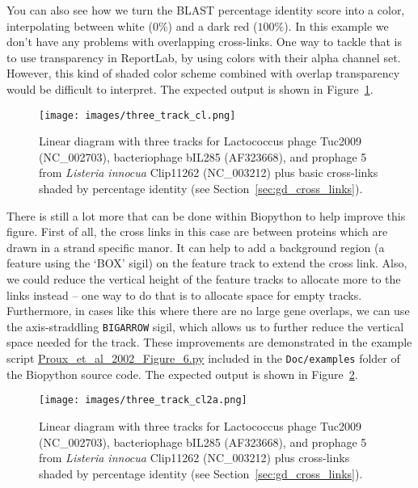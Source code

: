 You can also see how we turn the BLAST percentage identity score into a color,
interpolating between white ($0\%$) and a dark red ($100\%$). In this example
we don't have any problems with overlapping cross-links. One way to tackle that
is to use transparency in ReportLab, by using colors with their alpha channel set.
However, this kind of shaded color scheme combined with overlap transparency
would be difficult to interpret.
\noindent The expected output is shown in Figure~\ref{fig:three_track_cl}.
\begin{figure}[htbp]
\centering
\texttt{[image: images/three\_track\_cl.png]}
\caption{Linear diagram with three tracks for Lactococcus phage Tuc2009
(NC\_002703), bacteriophage bIL285 (AF323668), and prophage 5 from
\textit{Listeria innocua} Clip11262 (NC\_003212) plus basic cross-links
shaded by percentage identity (see Section~\ref{sec:gd_cross_links}).}
\label{fig:three_track_cl}
\end{figure}

There is still a lot more that can be done within Biopython to help
improve this figure. First of all, the cross links in this case are
between proteins which are drawn in a strand specific manor. It can
help to add a background region (a feature using the `BOX' sigil) on the
feature track to extend the cross link. Also, we could reduce the vertical
height of the feature tracks to allocate more to the links instead -- one
way to do that is to allocate space for empty tracks. Furthermore,
in cases like this where there are no large gene overlaps, we can use
the axis-straddling \verb|BIGARROW| sigil, which allows us to further
reduce the vertical space needed for the track. These improvements
are demonstrated in the example script
\href{https://github.com/biopython/biopython/blob/master/Doc/examples/Proux_et_al_2002_Figure_6.py}{Proux\_et\_al\_2002\_Figure\_6.py}
included in the \texttt{Doc/examples} folder of the Biopython source code.
\noindent The expected output is shown in Figure~\ref{fig:three_track_cl2}.
\begin{figure}[htbp]
\centering
\texttt{[image: images/three\_track\_cl2a.png]}
\caption{Linear diagram with three tracks for Lactococcus phage Tuc2009
(NC\_002703), bacteriophage bIL285 (AF323668), and prophage 5 from
\textit{Listeria innocua} Clip11262 (NC\_003212) plus cross-links
shaded by percentage identity (see Section~\ref{sec:gd_cross_links}).}
\label{fig:three_track_cl2}
\end{figure}

